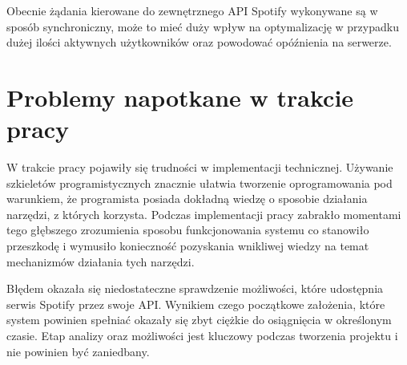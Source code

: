 Obecnie żądania kierowane do zewnętrznego API Spotify wykonywane są w sposób synchroniczny, może to mieć duży wpływ na optymalizację w przypadku dużej ilości aktywnych użytkowników oraz powodować opóźnienia na serwerze.

\section{Problemy napotkane w trakcie pracy}
W trakcie pracy pojawiły się trudności w implementacji technicznej. Używanie szkieletów programistycznych znacznie ułatwia tworzenie oprogramowania pod warunkiem, że programista posiada dokładną wiedzę o sposobie działania narzędzi, z których korzysta. Podczas implementacji pracy zabrakło momentami tego głębszego zrozumienia sposobu funkcjonowania systemu co stanowiło przeszkodę i wymusiło konieczność pozyskania wnikliwej wiedzy na temat mechanizmów działania tych narzędzi.

Błędem okazała się niedostateczne sprawdzenie możliwości, które udostępnia serwis Spotify przez swoje API. Wynikiem czego początkowe założenia, które system powinien spełniać okazały się zbyt ciężkie do osiągnięcia w określonym czasie. Etap analizy oraz możliwości jest kluczowy podczas tworzenia projektu i nie powinien być zaniedbany.

